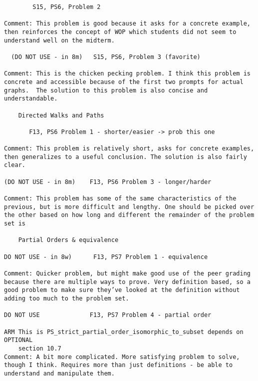 \documentclass[handout]{mcs}
\begin{document}
\begin{staffnotes}
\begin{verbatim}
        S15, PS6, Problem 2

Comment: This problem is good because it asks for a concrete example,
then reinforces the concept of WOP which students did not seem to
understand well on the midterm.

  (DO NOT USE - in 8m)   S15, PS6, Problem 3 (favorite) 

Comment: This is the chicken pecking problem. I think this problem is
concrete and accessible because of the first two prompts for actual
graphs.  The solution to this problem is also concise and
understandable.

    Directed Walks and Paths

       F13, PS6 Problem 1 - shorter/easier -> prob this one

Comment: This problem is relatively short, asks for concrete examples,
then generalizes to a useful conclusion. The solution is also fairly
clear.

(DO NOT USE - in 8m)    F13, PS6 Problem 3 - longer/harder 

Comment: This problem has some of the same characteristics of the
previous, but is more difficult and lengthy. One should be picked over
the other based on how long and different the remainder of the problem
set is

    Partial Orders & equivalence

DO NOT USE - in 8w)      F13, PS7 Problem 1 - equivalence

Comment: Quicker problem, but might make good use of the peer grading
because there are multiple ways to prove. Very definition based, so a
good problem to make sure they’ve looked at the definition without
adding too much to the problem set.

DO NOT USE              F13, PS7 Problem 4 - partial order

ARM This is PS_strict_partial_order_isomorphic_to_subset depends on OPTIONAL
    section 10.7
Comment: A bit more complicated. More satisfying problem to solve,
though I think. Requires more than just definitions - be able to
understand and manipulate them.
\end{verbatim}
\end{staffnotes}






\end{document}
